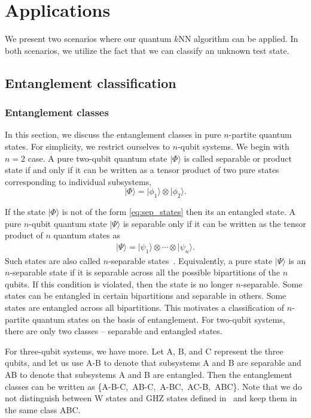 \documentclass[a4paper,twocolumn,11pt,unpublished]{quantumarticle}
\newcommand{\rang}{\rangle}
\begin{document}
      
\section{Applications}\label{sec:app}
    We present two scenarios where our quantum $k$NN algorithm can be applied. In both scenarios, we utilize the fact that we can classify an unknown test state. 
    
    \subsection{Entanglement classification}
    
    \subsubsection{Entanglement classes}
         In this section, we discuss the entanglement classes in pure $n$-partite quantum states. For simplicity, we restrict ourselves to $n$-qubit systems. We begin with $n=2$ case. A pure two-qubit quantum state $|\Phi\rangle$ is called separable or product state if and only if it can be written as a tensor product of two pure states corresponding to individual subsystems,
        \begin{equation}\label{eq:sep_states}
            |{\Phi}\rang = |{\phi_1}\rang \otimes |{\phi_2}\rang.
        \end{equation} 

        If the state $|{\Phi}\rang$ is not of the form \eqref{eq:sep_states} then its an entangled state. A pure $n$-qubit quantum state $|\Psi\rang$ is separable only  if it can be written as the tensor product of $n$ quantum states as 
        \begin{align}
           |{\Psi}\rang = |{\psi_1}\rang\otimes \cdots \otimes |{\psi_n}\rang.
        \end{align}
        Such states are also called $n$-separable states~\cite{Horodecki2009}. Equivalently, a pure state $|\Psi\rang$ is an $n$-separable state if it is separable across all the possible bipartitions of the $n$ qubits. If this condition is violated, then the state is no longer $n$-separable. Some states can be entangled in certain bipartitions and separable in others. Some states are entangled across all bipartitions. This motivates a classification of $n$-partite quantum states on the basis of entanglement. For two-qubit systems, there are only two classes -- separable and entangled states. 
        
        \label{para:3qubit}For three-qubit systems, we have more. Let A, B, and C represent the three qubits, and let us use A-B to denote that subsystems A and B are separable and AB to denote that subsystems A and B are entangled. Then the entanglement classes can be written as \{A-B-C,~AB-C,~A-BC,~AC-B,~ABC\}. Note that we do not distinguish between W states and GHZ states defined in~\cite{Dur2000} and keep them in the same class ABC.
        
\end{document}
